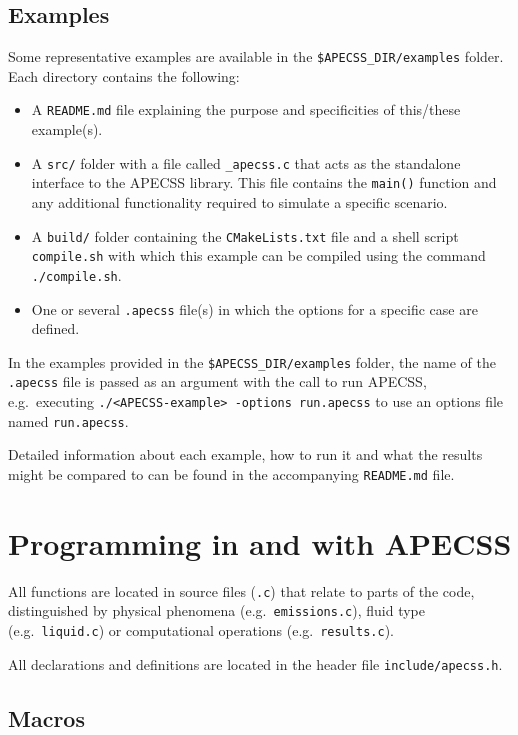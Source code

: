\subsection{Examples}

Some representative examples are available in the {\tt \$APECSS\_DIR/examples} folder. Each directory contains the following:\vspace{-1em}
\begin{itemize}[noitemsep]
  \item A {\tt README.md} file explaining the purpose and specificities of this/these example(s).
  \item A {\tt src/} folder with a file called {\tt *\_apecss.c} that acts as the standalone interface to the APECSS library. This file contains the {\tt main()} function and any additional functionality required to simulate a specific scenario.
  \item A {\tt build/} folder containing the {\tt CMakeLists.txt} file and a shell script {\tt compile.sh} with which this example can be compiled using the command {\tt ./compile.sh}.
  \item One or several {\tt *.apecss} file(s) in which the options for a specific case are defined.
\end{itemize}

In the examples provided in the {\tt \$APECSS\_DIR/examples} folder, the name of the  {\tt *.apecss} file is passed as an argument with the call to run APECSS, e.g.~executing {\tt ./<APECSS-example> -options run.apecss} to use an options file named {\tt run.apecss}.

Detailed information about each example, how to run it and what the results might be compared to can be found in the accompanying {\tt README.md} file.

\section{Programming in and with APECSS}

All functions are located in source files ({\tt *.c}) that relate to parts of the code, distinguished by physical phenomena (e.g.~{\tt emissions.c}), fluid type (e.g.~{\tt liquid.c}) or computational operations (e.g.~{\tt results.c}). 

All declarations and definitions are located in the header file {\tt include/apecss.h}. 

\subsection{Macros}

